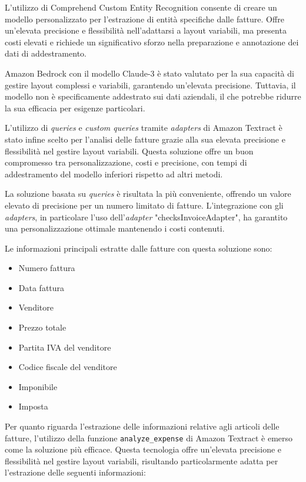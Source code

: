 L'utilizzo di Comprehend Custom Entity Recognition consente di creare un modello personalizzato per l'estrazione di entità specifiche dalle fatture. Offre un'elevata precisione e flessibilità nell'adattarsi a layout variabili, ma presenta costi elevati e richiede un significativo sforzo nella preparazione e annotazione dei dati di addestramento.

Amazon Bedrock con il modello Claude-3 è stato valutato per la sua capacità di gestire layout complessi e variabili, garantendo un'elevata precisione. Tuttavia, il modello non è specificamente addestrato sui dati aziendali, il che potrebbe ridurre la sua efficacia per esigenze particolari.

L'utilizzo di \textit{queries} e \textit{custom queries} tramite \textit{adapters} di Amazon Textract è stato infine scelto per l'analisi delle fatture grazie alla sua elevata precisione e flessibilità nel gestire layout variabili. Questa soluzione offre un buon compromesso tra personalizzazione, costi e precisione, con tempi di addestramento del modello inferiori rispetto ad altri metodi.

La soluzione basata su \textit{queries} è risultata la più conveniente, offrendo un valore elevato di precisione per un numero limitato di fatture. L'integrazione con gli \textit{adapters}, in particolare l'uso dell'\textit{adapter} "checksInvoiceAdapter", ha garantito una personalizzazione ottimale mantenendo i costi contenuti.

Le informazioni principali estratte dalle fatture con questa soluzione sono:

\begin{itemize}
    \item Numero fattura
    \item Data fattura
    \item Venditore
    \item Prezzo totale
    \item Partita IVA del venditore
    \item Codice fiscale del venditore
    \item Imponibile
    \item Imposta
\end{itemize}

Per quanto riguarda l'estrazione delle informazioni relative agli articoli delle fatture, l'utilizzo della funzione \texttt{analyze\_expense} di Amazon Textract è emerso come la soluzione più efficace. Questa tecnologia offre un'elevata precisione e flessibilità nel gestire layout variabili, risultando particolarmente adatta per l'estrazione delle seguenti informazioni:

